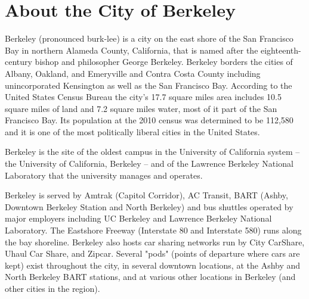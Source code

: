 
\vspace{3mm}
\section*{About the City of Berkeley}

Berkeley (pronounced burk-lee) is a city on the east shore of the San Francisco Bay in northern Alameda County, California, that is named after the eighteenth-century bishop and philosopher George Berkeley. Berkeley borders the cities of Albany, Oakland, and Emeryville and Contra Costa County including unincorporated Kensington as well as the San Francisco Bay. According to the United States Census Bureau the city's 17.7 square miles area includes 10.5 square miles of land and 7.2 square miles water, most of it part of the San Francisco Bay. Its population at the 2010 census was determined to be 112,580 and it is one of the most politically liberal cities in the United States.

Berkeley is the site of the oldest campus in the University of California system – the University of California, Berkeley – and of the Lawrence Berkeley National Laboratory that the university manages and operates. 

Berkeley is served by Amtrak (Capitol Corridor), AC Transit, BART (Ashby, Downtown Berkeley Station and North Berkeley) and bus shuttles operated by major employers including UC Berkeley and Lawrence Berkeley National Laboratory. The Eastshore Freeway (Interstate 80 and Interstate 580) runs along the bay shoreline. Berkeley also hosts car sharing networks run by City CarShare, Uhaul Car Share, and Zipcar. Several "pods" (points of departure where cars are kept) exist throughout the city, in several downtown locations, at the Ashby and North Berkeley BART stations, and at various other locations in Berkeley (and other cities in the region).

